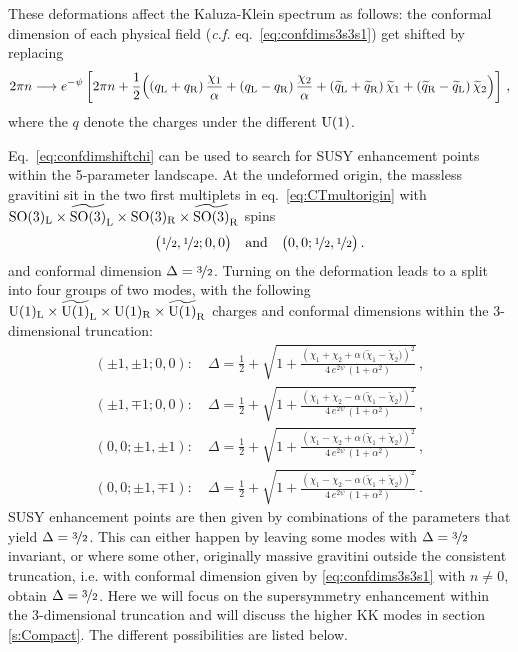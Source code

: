 \documentclass[a4paper, 11pt]{article}
\numberwithin{equation}{section}
\newcommand{\ts}[1]{\widetilde{#1}}
\newcommand{\+}{\oplus}
\begin{document}
These deformations affect the Kaluza-Klein spectrum as follows: the conformal dimension of each physical field (\textit{c.f.} eq.~\eqref{eq:confdims3s3s1}) get shifted by replacing
\begin{equation} \label{eq:confdimshiftchi}
	2\pi n\longrightarrow e^{-\psi} \left[ 2\pi n + \frac{1}{2}\Big((q_{\rm L}+q_{\rm R})\,\frac{\chi_{1}}{\alpha}+(q_{\rm L}-q_{\rm R})\,\frac{\chi_{2}}{\alpha}+ (\ts{q}_{\rm L}+\ts{q}_{\rm R})\,\ts{\chi}_{1} + (\ts{q}_{\rm R}-\ts{q}_{\rm L})\,\ts{\chi}_{2}\Big) \right]\,,
\end{equation}
where the $q$ denote the charges under the different ${\rm U}(1)$.

Eq.~\eqref{eq:confdimshiftchi} can be used to search for SUSY enhancement points within the 5-parameter landscape. At the undeformed origin, the massless gravitini sit in the two first multiplets in eq.~\eqref{eq:CTmultorigin} with ${\rm SO}(3)_{\rm L}\times\ts{{\rm SO}(3)}_{\rm L}\times{\rm SO}(3)_{\rm R}\times\ts{{\rm SO}(3)}_{\rm R}$ spins
\begin{equation}
	\big(\nicefrac{1}{2},\nicefrac{1}{2};0,0\big) \quad {\rm and} \quad \big(0,0;\nicefrac{1}{2},\nicefrac{1}{2}\big)\,.
\end{equation}
and conformal dimension $\Delta=\nicefrac{3}{2}$. Turning on the deformation leads to a split into four groups of two modes, with the following ${\rm U}(1)_{\rm L}\times\ts{{\rm U}(1)}_{\rm L}\times{\rm U}(1)_{\rm R}\times\ts{{\rm U}(1)}_{\rm R}$ charges and conformal dimensions within the 3-dimensional truncation:
\begin{equation}
	\begin{split}
		\left(\pm1,\pm1;0,0\right):\quad \Delta=\frac{1}{2}+\sqrt{1 + \frac{\left(%
		\chi_{1}+\chi_{2}+\alpha\,\big(\ts{\chi}_{1}-\ts{\chi}_{2}\big)\right)^{2}}{4\, e^{2\psi}\, (1+\alpha^{2})}}\,, \\
		\left(\pm1,\mp1;0,0\right):\quad \Delta=\frac{1}{2}+\sqrt{1 + \frac{\left(%
		\chi_{1}+\chi_{2}-\alpha\,\big(\ts{\chi}_{1}-\ts{\chi}_{2}\big)\right)^{2}}{4\, e^{2\psi}\, (1+\alpha^{2})}}\,, \\
		\left(0,0;\pm1,\pm1\right):\quad \Delta=\frac{1}{2}+\sqrt{1 + \frac{\left(%
		\chi_{1}-\chi_{2}+\alpha\,\big(\ts{\chi}_{1}+\ts{\chi}_{2}\big)\right)^{2}}{4\, e^{2\psi}\, (1+\alpha^{2})}}\,, \\
		\left(0,0;\pm1,\mp1\right):\quad \Delta=\frac{1}{2}+\sqrt{1 + \frac{\left(%
		\chi_{1}-\chi_{2} - \alpha\,\big(\ts{\chi}_{1}+\ts{\chi}_{2}\big)\right)^{2}}{4\, e^{2\psi}\, (1+\alpha^{2})}}\,.
	\end{split}
\end{equation}
SUSY enhancement points are then given by combinations of the parameters that yield $\Delta = \nicefrac32$. This can either happen by leaving some modes with $\Delta=\nicefrac{3}{2}$ invariant, or where some other, originally massive gravitini outside the consistent truncation, i.e. with conformal dimension given by \eqref{eq:confdims3s3s1} with $n \neq 0$, obtain $\Delta = \nicefrac32$. Here we will focus on the supersymmetry enhancement within the 3-dimensional truncation and will discuss the higher KK modes in section \ref{s:Compact}. The different possibilities are listed below.
\end{document}
